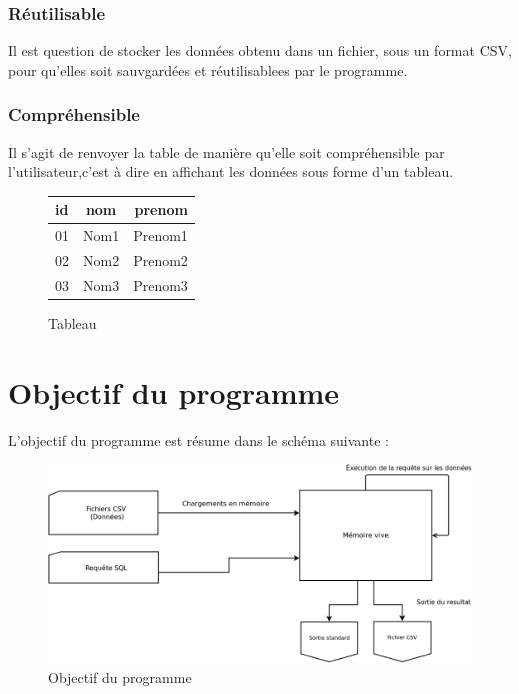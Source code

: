 \documentclass[oneside,13pt,a4paper]{report}
\begin{document}
\subsubsection{Réutilisable}

Il est question de stocker les données obtenu dans un fichier, sous un format CSV, pour qu'elles soit sauvgardées et réutilisablees par le programme.

\pagebreak

\subsubsection{Compréhensible}

Il s'agit de renvoyer la table de manière qu'elle soit compréhensible par l'utilisateur,c'est à dire en affichant les données sous forme d'un tableau.

\begin{figure}[h!]
		\centering
		\caption{Tableau}
		\vspace{0.1cm}
		\begin{tabular}{|l|c|r|}
			\hline
			id   & nom  & prenom
			\\
			\hline
			01 & Nom1 &  Prenom1 \\
			02 & Nom2 &  Prenom2 \\
			03 & Nom3 &  Prenom3 \\
			\hline
		\end{tabular}
\end{figure}

\section{Objectif du programme}

L'objectif du programme est résume dans le schéma suivante :
\begin{figure}[!h]
	\centering
	\includegraphics[width=1\textwidth]{img/role_prog.png}
	\vspace{0.1cm}
	\caption{Objectif du programme}
\end{figure}
\end{document}
